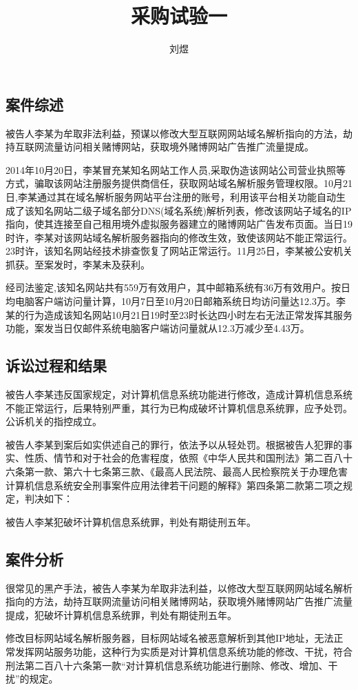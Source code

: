 \documentclass[a4paper,12pt]{article}
\title{采购试验一}
\author{刘煜}
\begin{document}
        
    \subsection{案件综述}
    

    被告人李某为牟取非法利益，预谋以修改大型互联网网站域名解析指向的方法，劫持互联网流量访问相关赌博网站，获取境外赌博网站广告推广流量提成。

    2014年10月20日，李某冒充某知名网站工作人员,采取伪造该网站公司营业执照等方式，骗取该网站注册服务提供商信任，获取网站域名解析服务管理权限。10月21日,李某通过其在域名解析服务网站平台注册的账号，利用该平台相关功能自动生成了该知名网站二级子域名部分DNS(域名系统)解析列表，修改该网站子域名的IP指向，使其连接至自己租用境外虚拟服务器建立的赌博网站广告发布页面。当日19时许，李某对该网站域名解析服务器指向的修改生效，致使该网站不能正常运行。23时许，该知名网站经技术排查恢复了网站正常运行。11月25日，李某被公安机关抓获。至案发时，李某未及获利。

    经司法鉴定,该知名网站共有559万有效用户，其中邮箱系统有36万有效用户。按日均电脑客户端访问量计算，10月7日至10月20日邮箱系统日均访问量达12.3万。李某的行为造成该知名网站10月21日19时至23时长达四小时左右无法正常发挥其服务功能，案发当日仅邮件系统电脑客户端访问量就从12.3万减少至4.43万。
    
    \subsection{诉讼过程和结果}
    被告人李某违反国家规定，对计算机信息系统功能进行修改，造成计算机信息系统不能正常运行，后果特别严重，其行为已构成破坏计算机信息系统罪，应予处罚。公诉机关的指控成立。

    被告人李某到案后如实供述自己的罪行，依法予以从轻处罚。根据被告人犯罪的事实、性质、情节和对于社会的危害程度，依照《中华人民共和国刑法》第二百八十六条第一款、第六十七条第三款、《最高人民法院、最高人民检察院关于办理危害计算机信息系统安全刑事案件应用法律若干问题的解释》第四条第二款第二项之规定，判决如下：


    被告人李某犯破坏计算机信息系统罪，判处有期徒刑五年。

    \subsection{案件分析}
    很常见的黑产手法，被告人李某为牟取非法利益，以修改大型互联网网站域名解析指向的方法，劫持互联网流量访问相关赌博网站，获取境外赌博网站广告推广流量提成，犯破坏计算机信息系统罪，判处有期徒刑五年。

    修改目标网站域名解析服务器，目标网站域名被恶意解析到其他IP地址，无法正常发挥网站服务功能，这种行为实质是对计算机信息系统功能的修改、干扰，符合刑法第二百八十六条第一款“对计算机信息系统功能进行删除、修改、增加、干扰”的规定。
\end{document}
